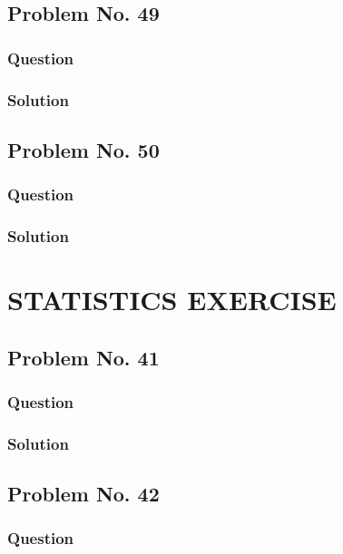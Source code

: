 \documentclass[journal,12pt,twocolumn]{IEEEtran}
\begin{document}
\subsection{Problem No. 49}
\subsubsection{Question}

\subsubsection{Solution}


\subsection{Problem No. 50}
\subsubsection{Question}

\subsubsection{Solution}


\section{STATISTICS EXERCISE}
\subsection{Problem No. 41}
\subsubsection{Question}

\subsubsection{Solution}


\subsection{Problem No. 42}
\subsubsection{Question}

\end{document}
